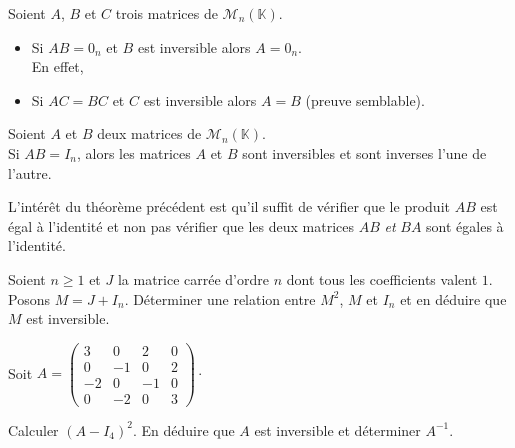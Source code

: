 \documentclass[a4paper,10pt]{report}
\begin{document}
\begin{Remarque}{}
 Soient $A$, $B$ et $C$ trois matrices de $\mathcal{M}_n(\mathbb{K})$.
\begin{itemize}
\item Si $AB=0_n$ et $B$ est inversible alors $A=0_n$.\\
En effet, 
\item Si $AC=BC$ et $C$ est inversible alors $A=B$ (preuve semblable).
\end{itemize}
\end{Remarque}

\medskip

\begin{Theoreme}{}
Soient $A$ et $B$ deux matrices de $\mathcal{M}_n(\mathbb{K})$.\\
Si $AB=I_n$, alors les matrices $A$ et $B$ sont inversibles et sont inverses l'une de l'autre.
\end{Theoreme}

\begin{Remarque}{} 
L'intérêt du théorème précédent est qu'il suffit de vérifier que le produit $AB$ est égal à l'identité et non pas vérifier que les deux matrices $AB$ \emph{et} $BA$ sont égales à l'identité.
\end{Remarque}

\begin{Exemple} Soient $n \geq 1$ et $J$ la matrice carrée d'ordre $n$ dont tous les coefficients valent $1$. Posons $M=J+ I_n$. Déterminer une relation entre $M^2$, $M$ et $I_n$ et en déduire que $M$ est inversible.

\vspace{7cm}
\end{Exemple}

\medskip

\begin{ApplicationDirecte}
Soit $A=\begin{pmatrix}
3& 0 & 2 & 0\\
0 & -1 & 0 & 2\\
-2 & 0& -1 & 0\\
0 & -2 & 0 & 3
\end{pmatrix} \cdot$

Calculer $(A-I_4)^2$. En déduire que $A$ est inversible et déterminer $A^{-1}$. 
%
\end{ApplicationDirecte}
\end{document}
